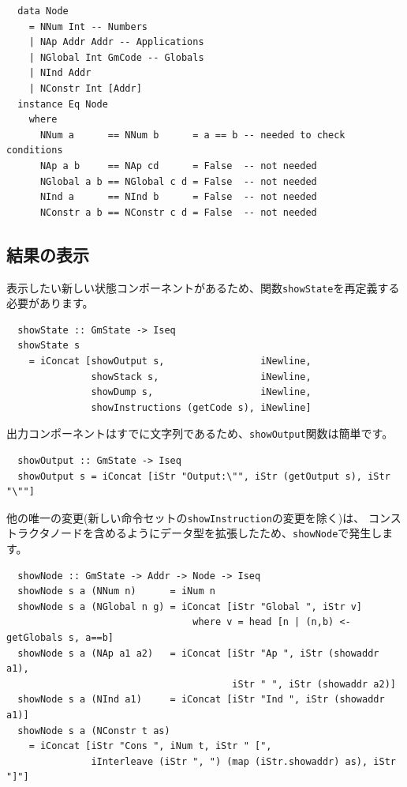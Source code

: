 \documentclass{jbook}
\begin{document}
\begin{verbatim}
  data Node
    = NNum Int -- Numbers
    | NAp Addr Addr -- Applications
    | NGlobal Int GmCode -- Globals
    | NInd Addr
    | NConstr Int [Addr]
  instance Eq Node
    where
      NNum a      == NNum b      = a == b -- needed to check conditions
      NAp a b     == NAp cd      = False  -- not needed
      NGlobal a b == NGlobal c d = False  -- not needed
      NInd a      == NInd b      = False  -- not needed
      NConstr a b == NConstr c d = False  -- not needed
\end{verbatim}

\subsection{結果の表示}

表示したい新しい状態コンポーネントがあるため、関数\texttt{showState}を再定義する必要があります。

\begin{verbatim}
  showState :: GmState -> Iseq
  showState s
    = iConcat [showOutput s,                 iNewline,
               showStack s,                  iNewline,
               showDump s,                   iNewline,
               showInstructions (getCode s), iNewline]
\end{verbatim}

出力コンポーネントはすでに文字列であるため、\texttt{showOutput}関数は簡単です。

\begin{verbatim}
  showOutput :: GmState -> Iseq
  showOutput s = iConcat [iStr "Output:\"", iStr (getOutput s), iStr "\""]
\end{verbatim}

他の唯一の変更(新しい命令セットの\texttt{showInstruction}の変更を除く)は、
コンストラクタノードを含めるようにデータ型を拡張したため、\texttt{showNode}で発生します。

\begin{verbatim}
  showNode :: GmState -> Addr -> Node -> Iseq
  showNode s a (NNum n)      = iNum n
  showNode s a (NGlobal n g) = iConcat [iStr "Global ", iStr v]
                                 where v = head [n | (n,b) <- getGlobals s, a==b]
  showNode s a (NAp a1 a2)   = iConcat [iStr "Ap ", iStr (showaddr a1),
                                        iStr " ", iStr (showaddr a2)]
  showNode s a (NInd a1)     = iConcat [iStr "Ind ", iStr (showaddr a1)]
  showNode s a (NConstr t as)
    = iConcat [iStr "Cons ", iNum t, iStr " [",
               iInterleave (iStr ", ") (map (iStr.showaddr) as), iStr "]"]
\end{verbatim}
\end{document}
